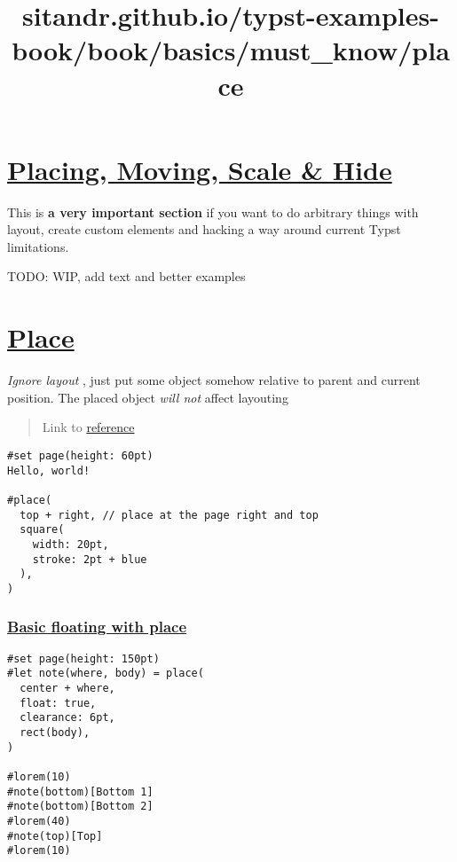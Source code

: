 \title{sitandr.github.io/typst-examples-book/book/basics/must_know/place}

\section{\texorpdfstring{\hyperref[placing-moving-scale--hide]{Placing,
Moving, Scale \&
Hide}}{Placing, Moving, Scale \& Hide}}\label{placing-moving-scale--hide}

This is \textbf{a very important section} if you want to do arbitrary
things with layout, create custom elements and hacking a way around
current Typst limitations.

TODO: WIP, add text and better examples

\section{\texorpdfstring{\hyperref[place]{Place}}{Place}}\label{place}

\emph{Ignore layout} , just put some object somehow relative to parent
and current position. The placed object \emph{will not} affect layouting

\begin{quote}
Link to \href{https://typst.app/docs/reference/layout/place/}{reference}
\end{quote}

\begin{verbatim}
#set page(height: 60pt)
Hello, world!

#place(
  top + right, // place at the page right and top
  square(
    width: 20pt,
    stroke: 2pt + blue
  ),
)
\end{verbatim}

\pandocbounded{}

\subsubsection{\texorpdfstring{\hyperref[basic-floating-with-place]{Basic
floating with
place}}{Basic floating with place}}\label{basic-floating-with-place}

\begin{verbatim}
#set page(height: 150pt)
#let note(where, body) = place(
  center + where,
  float: true,
  clearance: 6pt,
  rect(body),
)

#lorem(10)
#note(bottom)[Bottom 1]
#note(bottom)[Bottom 2]
#lorem(40)
#note(top)[Top]
#lorem(10)
\end{verbatim}

